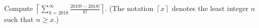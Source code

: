 Compute $\left\lceil\displaystyle\sum_{k=2018}^{\infty}\frac{2019!-2018!}{k!}\right\rceil$. (The notation $\left\lceil x\right\rceil$ denotes the least integer $n$ such that $n\geq x$.)
